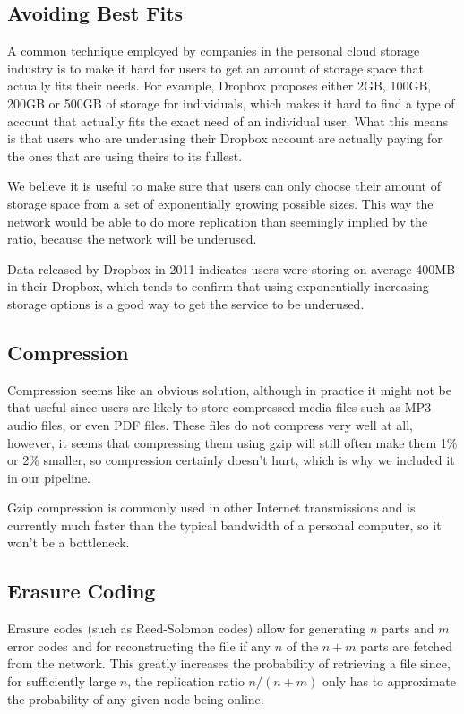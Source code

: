 \documentclass[11pt]{IEEEtran}
\begin{document}
\subsection{Avoiding Best Fits}

A common technique employed by companies in the personal cloud storage industry is to make it hard for users to get an amount of storage space that actually fits their needs. For example, Dropbox proposes either 2GB, 100GB, 200GB or 500GB of storage for individuals\cite{dropbox}, which makes it hard to find a type of account that actually fits the exact need of an individual user. What this means is that users who are underusing their Dropbox account are actually paying for the ones that are using theirs to its fullest.

We believe it is useful to make sure that users can only choose their amount of storage space from a set of exponentially growing possible sizes. This way the network would be able to do more replication than seemingly implied by the ratio, because the network will be underused.

Data released by Dropbox in 2011 indicates users were storing on average 400MB in their Dropbox\cite{dropbox_slides}, which tends to confirm that using exponentially increasing storage options is a good way to get the service to be underused.

\subsection{Compression}

Compression seems like an obvious solution, although in practice it might not be that useful since users are likely to store compressed media files such as MP3 audio files, or even PDF files. These files do not compress very well at all, however, it seems that compressing them using gzip will still often make them 1\% or 2\% smaller\cite{compression_comparison}, so compression certainly doesn't hurt, which is why we included it in our pipeline.

Gzip compression is commonly used in other Internet transmissions and is currently much faster than the typical bandwidth of a personal computer, so it won't be a bottleneck.

\subsection{Erasure Coding}

Erasure codes (such as Reed-Solomon codes) allow for generating $n$ parts and $m$ error codes and for reconstructing the file if any $n$ of the $n + m$ parts are fetched from the network. This greatly increases the probability of retrieving a file since, for sufficiently large $n$, the replication ratio $n/(n+m)$ only has to approximate the probability of any given node being online. 
\end{document}
